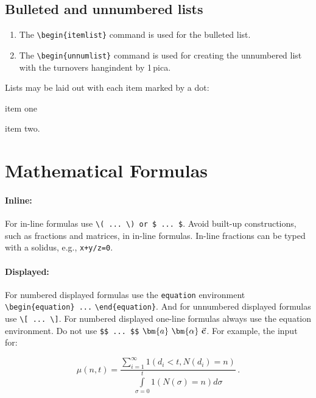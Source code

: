 \subsection{Bulleted and unnumbered lists}

\begin{enumerate}
\item[] The \verb|\begin{itemlist}| command is used for the bulleted list.

\smallskip

\item[] The \verb|\begin{unnumlist}| command is used for creating the
  unnumbered list with the turnovers hangindent by 1\,pica.
\end{enumerate}

Lists may be laid out with each item marked by a dot:

\begin{itemlist}
\item item one
\item item two.
\end{itemlist}

\section{Mathematical Formulas}
\paragraph{Inline:}
For in-line formulas use \verb|\( ... \) or $ ... $|. Avoid built-up
constructions, such as fractions and matrices, in in-line
formulas. In-line fractions can be typed with a solidus, e.g.,
\verb|x+y/z=0|.

\paragraph{Displayed:}
For numbered displayed formulas use the \verb|equation| environment
\verb|\begin{equation} ...| \verb|\end{equation}|.
And for unnumbered displayed formulas use \verb|\[ ... \]|. For
numbered displayed one-line formulas always use the equation
environment. Do not use \verb|$$ ... $$| $\bm{a}\ \bm{\alpha}\ \vec{\bf c}$. For example, the input
for:

\begin{equation}
\mu(n, t) = \frac{\sum\limits^\infty_{i=1}1 (d_i < t, N(d_i) = n)}
{\int\limits^t_{\sigma=0}1(N(\sigma)=n)d\sigma}\,. \label{eq1.1}
\end{equation}


